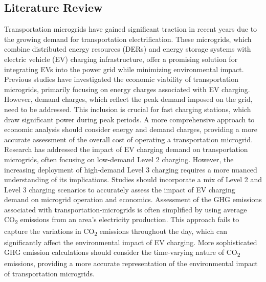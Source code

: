 \documentclass[conference, usletter]{IEEEtran}
\begin{document}
\subsection{Literature Review}
Transportation microgrids have gained significant traction in recent years due to the growing demand for transportation electrification. These microgrids, which combine distributed energy resources (DERs) and energy storage systems with electric vehicle (EV) charging infrastructure, offer a promising solution for integrating EVs into the power grid while minimizing environmental impact. Previous studies have investigated the economic viability of transportation microgrids, primarily focusing on energy charges associated with EV charging. However, demand charges, which reflect the peak demand imposed on the grid, need to be addressed. This inclusion is crucial for fast charging stations, which draw significant power during peak periods. A more comprehensive approach to economic analysis should consider energy and demand charges, providing a more accurate assessment of the overall cost of operating a transportation microgrid. Research has addressed the impact of EV charging demand on transportation microgrids, often focusing on low-demand Level 2 charging. However, the increasing deployment of high-demand Level 3 charging requires a more nuanced understanding of its implications. Studies should incorporate a mix of Level 2 and Level 3 charging scenarios to accurately assess the impact of EV charging demand on microgrid operation and economics. Assessment of the GHG emissions associated with transportation-microgrids is often simplified by using average CO\textsubscript{2} emissions from an area's electricity production. This approach fails to capture the variations in CO\textsubscript{2} emissions throughout the day, which can significantly affect the environmental impact of EV charging. More sophisticated GHG emission calculations should consider the time-varying nature of CO\textsubscript{2} emissions, providing a more accurate representation of the environmental impact of transportation microgrids. 
\end{document}
